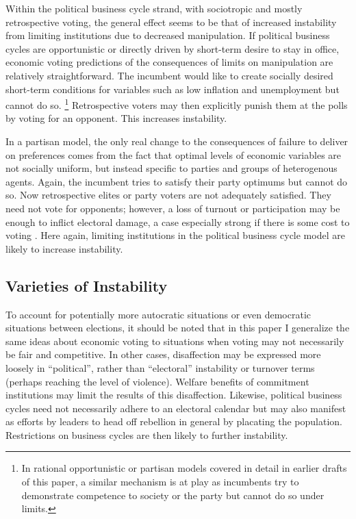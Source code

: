 \documentclass{article}
\begin{document}
    Within the political business cycle strand, with sociotropic and mostly retrospective voting, the general effect seems to be that of increased instability from limiting institutions due to decreased manipulation. If political business cycles are opportunistic or directly driven by short-term desire to stay in office, economic voting predictions of the consequences of limits on manipulation are relatively straightforward. The incumbent would like to create socially desired short-term conditions for variables such as low inflation and unemployment but cannot do so. \footnote{In rational opportunistic or partisan models covered in detail in earlier drafts of this paper, a similar mechanism is at play as incumbents try to demonstrate competence to society or the party but cannot do so under limits.} Retrospective voters may then explicitly punish them at the polls by voting for an opponent. This increases instability.

    In a partisan model, the only real change to the consequences of failure to deliver on preferences comes from the fact that optimal levels of economic variables are not socially uniform, but instead specific to parties and groups of heterogenous agents. Again, the incumbent tries to satisfy their party optimums but cannot do so. Now retrospective elites or party voters are not adequately satisfied. They need not vote for opponents; however, a loss of turnout or participation may be enough to inflict electoral damage, a case especially strong if there is some cost to voting \citep{downs_economic_1957}. Here again, limiting institutions in the political business cycle model are likely to increase instability.

    \subsection*{Varieties of Instability}

    To account for potentially more autocratic situations or even democratic situations between elections, it should be noted that in this paper I generalize the same ideas about economic voting to situations when voting may not necessarily be fair and competitive. In other cases, disaffection may be expressed more loosely in “political”, rather than “electoral” instability or turnover terms (perhaps reaching the level of violence). Welfare benefits of commitment institutions may limit the results of this disaffection. Likewise, political business cycles need not necessarily adhere to an electoral calendar but may also manifest as efforts by leaders to head off rebellion in general by placating the population. Restrictions on business cycles are then likely to further instability.
\end{document}
